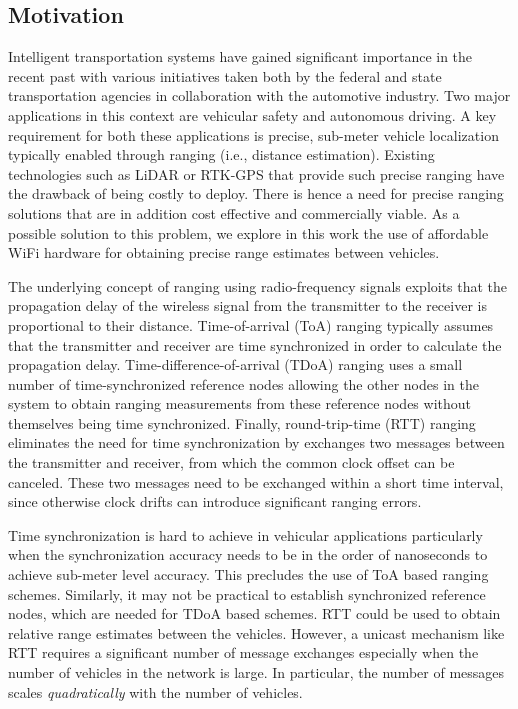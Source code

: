 \documentclass[12pt,journal,final,onecolumn]{IEEEtran}
\theoremstyle{definition}
\theoremstyle{myremark}
\begin{document}
\subsection{Motivation}
\label{sec:intro_motivation}

Intelligent transportation systems have gained significant importance in the
recent past with various initiatives taken both by the federal and state
transportation agencies in collaboration with the automotive industry. Two major
applications in this context are vehicular safety and autonomous driving. A key
requirement for both these applications is precise, sub-meter vehicle
localization \cite{drane1998positioning} typically enabled through ranging
(i.e., distance estimation).  Existing technologies such as LiDAR
\cite{khattak2003application} or RTK-GPS \cite{misra2006global} that provide
such precise ranging have the drawback of being costly to deploy. There is hence
a need for precise ranging solutions that are in addition cost effective and
commercially viable. As a possible solution to this problem, we explore in this
work the use of affordable WiFi hardware for obtaining precise range estimates
between vehicles.

The underlying concept of ranging using radio-frequency signals exploits that
the propagation delay of the wireless signal from the transmitter to the
receiver is proportional to their distance. Time-of-arrival (ToA) ranging
\cite{golden2007sensor} typically assumes that the transmitter and receiver are
time synchronized in order to calculate the propagation delay.
Time-difference-of-arrival (TDoA) ranging \cite{misra2006global} uses a small
number of time-synchronized reference nodes allowing the other nodes in the
system to obtain ranging measurements from these reference nodes without
themselves being time synchronized. Finally, round-trip-time (RTT) ranging
\cite{11mc} eliminates the need for time synchronization by exchanges two
messages between the transmitter and receiver, from which the common clock
offset can be canceled. These two messages need to be exchanged within a short
time interval, since otherwise clock drifts can introduce significant ranging
errors.

Time synchronization is hard to achieve in vehicular applications particularly
when the synchronization accuracy needs to be in the order of nanoseconds to
achieve sub-meter level accuracy. This precludes the use of ToA based ranging
schemes. Similarly, it may not be practical to establish synchronized reference
nodes, which are needed for TDoA based schemes. RTT could be used to obtain
relative range estimates between the vehicles. However, a unicast mechanism like
RTT requires a significant number of message exchanges especially when the number
of vehicles in the network is large. In particular, the number of messages
scales \emph{quadratically} with the number of vehicles. 
\end{document}
